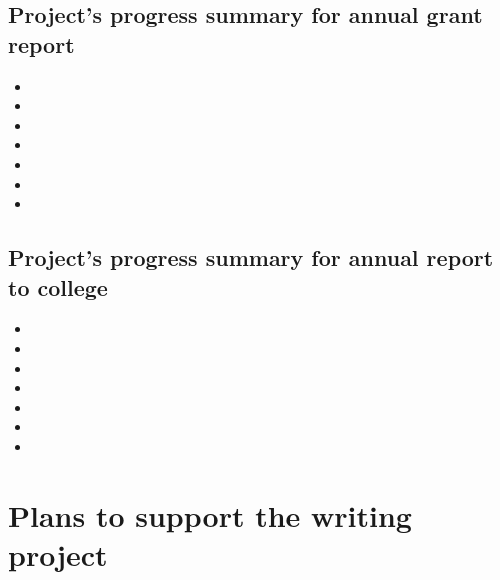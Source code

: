 \documentclass[11pt,letterpaper]{article}
\begin{document}
\subsection{Project's progress summary for annual grant report}
\label{sec:orgbc42568}

\begin{itemize}
\item 

\item 

\item 

\item 

\item 

\item 

\item 
\end{itemize}



\subsection{Project's progress summary for annual report to college}
\label{sec:org96acc7d}

\begin{itemize}
\item 

\item 

\item 

\item 

\item 

\item 

\item 
\end{itemize}



\section{Plans to support the writing project}
\label{sec:orga1c3b23}

\end{document}

